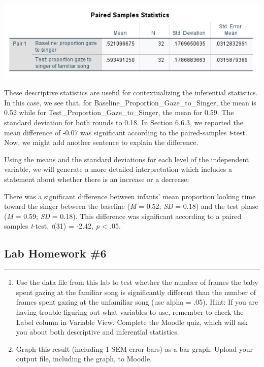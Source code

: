 \documentclass[
]{book}
\begin{document}
\includegraphics{img/6.4.34.png}

These descriptive statistics are useful for contextualizing the inferential statistics. In this case, we see that, for Baseline\_Proportion\_Gaze\_to\_Singer, the mean is 0.52 while for Test\_Proportion\_Gaze\_to\_Singer, the mean for 0.59. The standard deviation for both rounds to 0.18. In Section 6.6.3, we reported the mean difference of -0.07 was significant according to the paired-samples \emph{t}-test. Now, we might add another sentence to explain the difference.

Using the means and the standard deviations for each level of the independent variable, we will generate a more detailed interpretation which includes a statement about whether there is an increase or a decrease:

There was a significant difference between infants' mean proportion looking time toward the singer between the baseline (\emph{M} = 0.52; \emph{SD} = 0.18) and the test phase (\emph{M} = 0.59; \emph{SD} = 0.18). This difference was significant according to a paired samples \emph{t}-test, \emph{t}(31) = -2.42, \emph{p} \textless{} .05.

\hypertarget{lab-homework-6}{%
\subsection{Lab Homework \#6}\label{lab-homework-6}}

\begin{center}\rule{0.5\linewidth}{0.5pt}\end{center}

\begin{enumerate}
\def\labelenumi{\arabic{enumi}.}
\item
  Use the data file from this lab to test whether the number of frames the baby spent gazing at the familiar song is significantly different than the number of frames spent gazing at the unfamiliar song (use alpha = .05). Hint: If you are having trouble figuring out what variables to use, remember to check the {Label} column in {Variable View}. Complete the Moodle quiz, which will ask you about both descriptive and inferential statistics.
\item
  Graph this result (including 1 SEM error bars) as a bar graph. Upload your output file, including the graph, to Moodle.
\end{enumerate}
\end{document}
